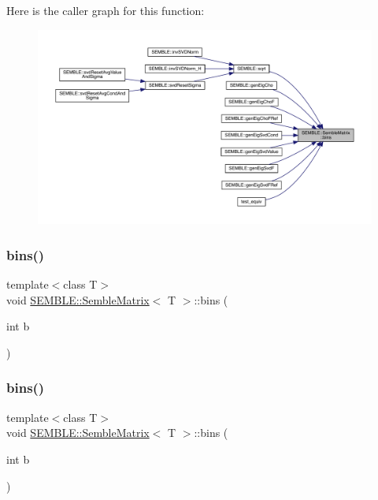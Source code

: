 Here is the caller graph for this function\+:
\nopagebreak
\begin{figure}[H]
\begin{center}
\leavevmode
\includegraphics[width=350pt]{df/d87/structSEMBLE_1_1SembleMatrix_af79972f16dd8874677ed61b5bfdc7ed3_icgraph}
\end{center}
\end{figure}
\mbox{\label{structSEMBLE_1_1SembleMatrix_ae3efc835049db0182eaf149bcbf9d142}} 
\subsubsection{\texorpdfstring{bins()}{bins()}\hspace{0.1cm}{\footnotesize\ttfamily [3/4]}}
{\footnotesize\ttfamily template$<$class T$>$ \\
void \mbox{\hyperlink{structSEMBLE_1_1SembleMatrix}{S\+E\+M\+B\+L\+E\+::\+Semble\+Matrix}}$<$ T $>$\+::bins (\begin{DoxyParamCaption}\item[{int}]{b }\end{DoxyParamCaption})\hspace{0.3cm}{\ttfamily [inline]}}

\mbox{\label{structSEMBLE_1_1SembleMatrix_ae3efc835049db0182eaf149bcbf9d142}} 
\subsubsection{\texorpdfstring{bins()}{bins()}\hspace{0.1cm}{\footnotesize\ttfamily [4/4]}}
{\footnotesize\ttfamily template$<$class T$>$ \\
void \mbox{\hyperlink{structSEMBLE_1_1SembleMatrix}{S\+E\+M\+B\+L\+E\+::\+Semble\+Matrix}}$<$ T $>$\+::bins (\begin{DoxyParamCaption}\item[{int}]{b }\end{DoxyParamCaption})\hspace{0.3cm}{\ttfamily [inline]}}

